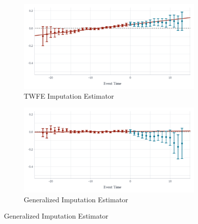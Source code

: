 \documentclass[12pt]{article}
\begin{document}
\begin{figure}
\caption{Effect of Walmart on County $\log$ wholesale Employment}
\label{fig:walmart_wholesale}

\begin{center}
\begin{subfigure}[b]{0.75\textwidth}
  \caption{TWFE Imputation Estimator}
  \begin{adjustbox}{width=\textwidth, center}
    \includegraphics{figures/Walmart/did2s_wholesale.pdf}
  \end{adjustbox}
\end{subfigure}
\end{center}
\begin{center}
\begin{subfigure}[b]{0.75\textwidth}
  \caption{Generalized Imputation Estimator}
  \begin{adjustbox}{width=\textwidth, center}
    \includegraphics{figures/Walmart/qld_wholesale.pdf}
  \end{adjustbox}
\end{subfigure}
\end{center}


\end{figure}
\end{document}
